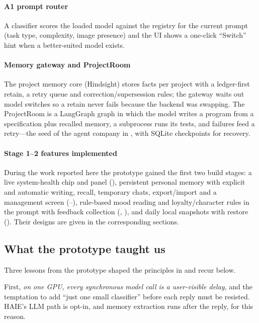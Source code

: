 \paragraph{A1 prompt router} A classifier scores the loaded model against the registry for the current prompt (task type, complexity, image presence) and the UI shows a one-click ``Switch'' hint when a better-suited model exists.

\paragraph{Memory gateway and ProjectRoom} The project memory core (Hindsight) stores facts per project with a ledger-first retain, a retry queue and correction/supersession rules; the gateway waits out model switches so a retain never fails because the backend was swapping. The ProjectRoom is a LangGraph graph in which the model writes a program from a specification plus recalled memory, a subprocess runs its tests, and failures feed a retry---the seed of the agent company in , with SQLite checkpoints for recovery.

\paragraph{Stage 1--2 features implemented} During the work reported here the prototype gained the first two build stages: a live system-health chip and panel (), persistent personal memory with explicit and automatic writing, recall, temporary chats, export/import and a management screen (--), rule-based mood reading and loyalty/character rules in the prompt with feedback collection (, ), and daily local snapshots with restore (). Their designs are given in the corresponding sections.

\subsection{What the prototype taught us}

Three lessons from the prototype shaped the principles in  and recur below.

First, \emph{on one GPU, every synchronous model call is a user-visible delay}, and the temptation to add ``just one small classifier'' before each reply must be resisted. HAIE's LLM path is opt-in, and memory extraction runs after the reply, for this reason.

